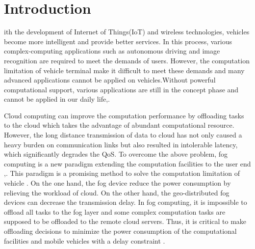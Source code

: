 \documentclass[journal]{IEEEtran}
\begin{document}
\section{Introduction}
% 
% 
% 
% 
ith the development of Internet of Things(IoT) and wireless technologies, vehicles become more intelligent and provide better services\cite{1}. In this process, various complex-computing applications such as autonomous driving and image recognition are required to meet the demands of users. However, the computation limitation of vehicle terminal make it difficult to meet these demands and many advanced applications cannot be applied on vehicles.Without powerful computational support, various applications are still in the concept phase and cannot be applied in our daily life\cite{2},\cite{3}.

Cloud computing can improve the computation performance by offloading tasks to the cloud which takes the advantage of abundant computational resource\cite{4}. However, the long distance transmission of data to cloud has not only caused a heavy burden on communication links but also resulted in intolerable latency, which significantly degrades the QoS. To overcome the above problem, fog computing is a new paradigm extending the computation facilities to the user end \cite{5},\cite{6}. This paradigm is a promising method to solve the computation limitation of vehicle \cite{7}. On the one hand, the fog device reduce the power consumption by relieving the workload of cloud. On the other hand, the geo-distributed fog devices can decrease the transmission delay. In fog computing, it is impossible to offload all tasks to the fog layer and some complex computation tasks are supposed to be offloaded to the remote cloud servers. Thus, it is critical to make offloading decisions to minimize the power consumption of the computational facilities and mobile vehicles with a delay constraint \cite{8}.
\end{document}
